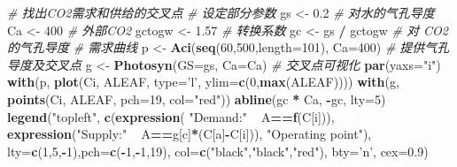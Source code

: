 \documentclass[]{krantz}
\makeatletter
\newenvironment{Shaded}{\begin{snugshade}}{\end{snugshade}}
\newcommand{\KeywordTok}[1]{\textcolor[rgb]{0.13,0.29,0.53}{\textbf{#1}}}
\newcommand{\DataTypeTok}[1]{\textcolor[rgb]{0.13,0.29,0.53}{#1}}
\newcommand{\DecValTok}[1]{\textcolor[rgb]{0.00,0.00,0.81}{#1}}
\newcommand{\FloatTok}[1]{\textcolor[rgb]{0.00,0.00,0.81}{#1}}
\newcommand{\StringTok}[1]{\textcolor[rgb]{0.31,0.60,0.02}{#1}}
\newcommand{\CommentTok}[1]{\textcolor[rgb]{0.56,0.35,0.01}{\textit{#1}}}
\newcommand{\OperatorTok}[1]{\textcolor[rgb]{0.81,0.36,0.00}{\textbf{#1}}}
\newcommand{\ErrorTok}[1]{\textcolor[rgb]{0.64,0.00,0.00}{\textbf{#1}}}
\newcommand{\NormalTok}[1]{#1}
\newenvironment{kframe}{%
\medskip{}
\setlength{\fboxsep}{.8em}
 \def\at@end@of@kframe{}%
 \ifinner\ifhmode%
  \def\at@end@of@kframe{\end{minipage}}%
  \begin{minipage}{\columnwidth}%
 \fi\fi%
 \def\FrameCommand##1{\hskip\@totalleftmargin \hskip-\fboxsep
 \colorbox{shadecolor}{##1}\hskip-\fboxsep
     \hskip-\linewidth \hskip-\@totalleftmargin \hskip\columnwidth}%
 \MakeFramed {\advance\hsize-\width
   \@totalleftmargin\z@ \linewidth\hsize
   \@setminipage}}%
 {\par\unskip\endMakeFramed%
 \at@end@of@kframe}
\renewenvironment{Shaded}{\begin{kframe}}{\end{kframe}}
\theoremstyle{definition}
\theoremstyle{definition}
\theoremstyle{definition}
\theoremstyle{remark}
\makeatother
\begin{document}
\begin{Shaded}
\begin{Highlighting}[]
\CommentTok{# 找出CO2需求和供给的交叉点}
\CommentTok{# 设定部分参数}
\NormalTok{gs <-}\StringTok{ }\FloatTok{0.2} \CommentTok{# 对水的气孔导度}
\NormalTok{Ca <-}\StringTok{ }\DecValTok{400} \CommentTok{# 外部CO2}
\NormalTok{gctogw <-}\StringTok{ }\FloatTok{1.57} \CommentTok{# 转换系数}
\NormalTok{gc <-}\StringTok{ }\NormalTok{gs }\OperatorTok{/}\StringTok{ }\NormalTok{gctogw }\CommentTok{# 对 CO2 的气孔导度}
\CommentTok{# 需求曲线}
\NormalTok{p <-}\StringTok{ }\KeywordTok{Aci}\NormalTok{(}\KeywordTok{seq}\NormalTok{(}\DecValTok{60}\NormalTok{,}\DecValTok{500}\NormalTok{,}\DataTypeTok{length=}\DecValTok{101}\NormalTok{), }\DataTypeTok{Ca=}\DecValTok{400}\NormalTok{)}
\CommentTok{# 提供气孔导度及交叉点}
\NormalTok{g <-}\StringTok{ }\KeywordTok{Photosyn}\NormalTok{(}\DataTypeTok{GS=}\NormalTok{gs, }\DataTypeTok{Ca=}\NormalTok{Ca)}
\CommentTok{# 交叉点可视化}
\KeywordTok{par}\NormalTok{(}\DataTypeTok{yaxs=}\StringTok{"i"}\NormalTok{)}
\KeywordTok{with}\NormalTok{(p, }\KeywordTok{plot}\NormalTok{(Ci, ALEAF, }\DataTypeTok{type=}\StringTok{'l'}\NormalTok{, }
             \DataTypeTok{ylim=}\KeywordTok{c}\NormalTok{(}\DecValTok{0}\NormalTok{,}\KeywordTok{max}\NormalTok{(ALEAF))))}
\KeywordTok{with}\NormalTok{(g, }\KeywordTok{points}\NormalTok{(Ci, ALEAF, }\DataTypeTok{pch=}\DecValTok{19}\NormalTok{, }\DataTypeTok{col=}\StringTok{"red"}\NormalTok{))}
\KeywordTok{abline}\NormalTok{(gc }\OperatorTok{*}\StringTok{ }\NormalTok{Ca, }\OperatorTok{-}\NormalTok{gc, }\DataTypeTok{lty=}\DecValTok{5}\NormalTok{)}
\KeywordTok{legend}\NormalTok{(}\StringTok{"topleft"}\NormalTok{, }\KeywordTok{c}\NormalTok{(}\KeywordTok{expression}\NormalTok{(}
  \StringTok{"Demand:"}\OperatorTok{~}\ErrorTok{~}\NormalTok{A}\OperatorTok{==}\KeywordTok{f}\NormalTok{(C[i])),}
   \KeywordTok{expression}\NormalTok{(}\StringTok{"Supply:"}\OperatorTok{~}\ErrorTok{~}\NormalTok{A}\OperatorTok{==}\NormalTok{g[c]}\OperatorTok{*}\NormalTok{(C[a]}\OperatorTok{-}\NormalTok{C[i])),}
              \StringTok{"Operating point"}\NormalTok{),}
   \DataTypeTok{lty=}\KeywordTok{c}\NormalTok{(}\DecValTok{1}\NormalTok{,}\DecValTok{5}\NormalTok{,}\OperatorTok{-}\DecValTok{1}\NormalTok{),}\DataTypeTok{pch=}\KeywordTok{c}\NormalTok{(}\OperatorTok{-}\DecValTok{1}\NormalTok{,}\OperatorTok{-}\DecValTok{1}\NormalTok{,}\DecValTok{19}\NormalTok{),}
   \DataTypeTok{col=}\KeywordTok{c}\NormalTok{(}\StringTok{"black"}\NormalTok{,}\StringTok{"black"}\NormalTok{,}\StringTok{"red"}\NormalTok{),}
   \DataTypeTok{bty=}\StringTok{'n'}\NormalTok{, }\DataTypeTok{cex=}\FloatTok{0.9}\NormalTok{)}
\end{Highlighting}
\end{Shaded}
\end{document}

